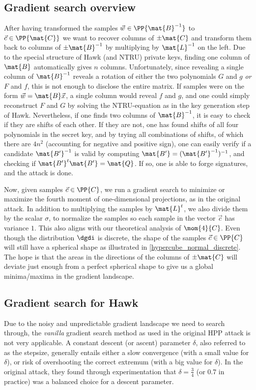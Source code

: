 \subsection{Gradient search overview}
After having transformed the samples $\vec{w} \in \PP{\mat{B}^{-1}}$ to $\vec{c} \in \PP{\mat{C}}$ we want to recover columns of $\pm \mat{C}$ and transform them back to columns of $\pm \mat{B}^{-1}$ by multiplying by $\mat{L}^{-1}$ on the left.
Due to the special structure of Hawk (and NTRU) private keys, finding one column of $\mat{B}$ automatically gives $n$ columns.
Unfortunately, since revealing a single column of $ \mat{B}^{-1}$ reveals a rotation of either the two polynomials $G$ and $ g$ \textit{or} $F$ and $f$,
this is not enough to disclose the entire matrix. If samples were on the form $\vec{w} = \mat{B} \vec{x}$, a single column would reveal $f$ and $g$, and one could simply reconstruct $F$ and $G$
by solving the NTRU-equation as in the key generation step of Hawk.
Nevertheless, if one finds two columns of $\mat{B}^{-1}$, it is easy to check if they are shifts of each other. If they are not, one has found shifts of all four polynomials in the secret key, 
and by trying all combinations of shifts, of which there are $4 n^2$ (accounting for negative and positive sign), one can easily verify if a candidate $\mat{B'}^{-1}$ is valid by computing 
$\mat{B'} = (\mat{B'}^{-1})^{-1}$, and checking if $\mat{B'}^t \mat{B'} = \mat{Q}$. If so, one is able to forge signatures, and the attack is done.

Now, given samples $\vec{c} \in \PP{C}$, we run a gradient search to minimize or maximize the fourth moment of one-dimensional projections, as in the original attack. In addition to multiplying the samples by $\mat{L}^t$, we also divide them by the scalar $\sigma$, to normalize the samples
so each sample in the vector $\vec{c}$ has variance $1$. This also aligns with our theoretical analysis of $\mom{4}{C}$. Even though the distribution $\dgdi$ is discrete, the shape of the samples $\vec{c} \in \PP{C}$ will still have a spherical
shape as illustrated in \ref{hypercube_normal_discrete}. The hope is that the areas in the directions of the columns of $\pm \mat{C}$ will deviate just enough from a perfect spherical shape to give us a global minima/maxima in the gradient landscape.

\subsection{Gradient search for Hawk}
Due to the noisy and unpredictable gradient landscape we need to search through, the \textit{vanilla} gradient search method as used in the original HPP attack is not very applicable.
A constant descent (or ascent) parameter $\delta$, also referred to as the stepsize, generally entails either a slow convergence (with a small value for $\delta$), or risk of overshooting the correct extremum (with a big value for $\delta$).
In the original attack, they found through experimentation that $\delta = \frac{3}{4}$ (or 0.7 in practice) was a balanced choice for a descent parameter.

